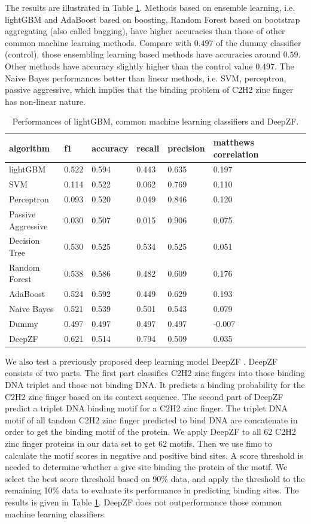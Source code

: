 \documentclass{article}
\begin{document}
The results are illustrated in Table \ref{tab:benchmarks}. Methods based on ensemble learning, i.e. lightGBM and AdaBoost based on boosting, Random Forest based on bootstrap aggregating (also called bagging), have higher accuracies than those of other common machine learning methods. Compare with $0.497$ of the dummy classifier (control), those ensembling learning based methods have accuracies around $0.59$. Other methods have accuracy slightly higher than the control value $0.497$. The Naive Bayes performances better than linear methods, i.e. SVM, perceptron, passive aggressive, which implies that the binding problem of C2H2 zinc finger has non-linear nature.
\begin{table}[H]
    \caption{Performances of lightGBM, common machine learning classifiers and DeepZF.}\label{tab:benchmarks}
    \begin{tabular}{|l|l|l|l|l|l|l|l|l|l|}
        \hline
        algorithm & f1 & accuracy & recall & precision & matthews correlation \\
        \hline
        lightGBM & 0.522 & 0.594 & 0.443 & 0.635 & 0.197 \\
        SVM & 0.114 & 0.522 & 0.062 & 0.769 & 0.110 \\
        Perceptron & 0.093 & 0.520 & 0.049 & 0.846 & 0.120 \\
        Passive Aggressive & 0.030 & 0.507 & 0.015 & 0.906 & 0.075 \\
        Decision Tree & 0.530 & 0.525 & 0.534 & 0.525 & 0.051 \\
        Random Forest & 0.538 & 0.586 & 0.482 & 0.609 & 0.176 \\
        AdaBoost & 0.524 & 0.592 & 0.449 & 0.629 & 0.193 \\
        Naive Bayes & 0.521 & 0.539 & 0.501 & 0.543 & 0.079 \\
        Dummy & 0.497 & 0.497 & 0.497 & 0.497 & -0.007 \\
        DeepZF & 0.621 & 0.514 & 0.794 & 0.509 & 0.035 \\
        \hline
    \end{tabular}
\end{table}

We also test a previously proposed deep learning model DeepZF \cite{10.1093/bioinformatics/btac469}. DeepZF consists of two parts. The first part classifies C2H2 zinc fingers into those binding DNA triplet and those not binding DNA. It predicts a binding probability for the C2H2 zinc finger based on its context sequence. The second part of DeepZF predict a triplet DNA binding motif for a C2H2 zinc finger. The triplet DNA motif of all tandom C2H2 zinc finger predicted to bind DNA are concatenate in order to get the binding motif of the protein. We apply DeepZF to all 62 C2H2 zinc finger proteins in our data set to get 62 motifs. Then we use fimo to calculate the motif scores in negative and positive bind sites. A score threshold is needed to determine whether a give site binding the protein of the motif. We select the best score threshold based on 90\% data, and apply the threshold to the remaining 10\% data to evaluate its performance in predicting binding sites. The results is given in Table \ref{tab:benchmarks}. DeepZF does not outperformance those common machine learning classifiers.



\end{document}
